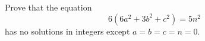 Prove that the equation \[6\left(6a^2+3b^2+c^2\right)=5n^2\] has no solutions in integers except $a=b=c=n=0$.